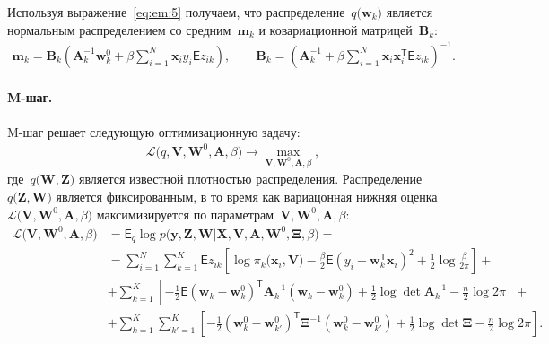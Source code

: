 Используя выражение~\eqref{eq:em:5} получаем, что  распределение~$q\bigr(\mathbf{w}_{k}\bigr)$ является нормальным распределением со средним~$\mathbf{m}_{k}$ и ковариационной матрицей~$\mathbf{B}_k$:
\[
\label{eq:em:6}
\begin{aligned}
\mathbf{m}_{k} = \mathbf{B}_{k}\left(\mathbf{A}_{k}^{-1}\mathbf{w}_{k}^{0}+\beta\sum_{i=1}^{N}\mathbf{x}_{i}y_{i}\mathsf{E}z_{ik}\right), \qquad \mathbf{B}_{k} = \left(\mathbf{A}_{k}^{-1}+\beta\sum_{i=1}^{N}\mathbf{x}_{i}\mathbf{x}_{i}^{\mathsf{T}}\mathsf{E}z_{ik}\right)^{-1}.
\end{aligned}
\]

\paragraph{M-шаг.} M-шаг решает следующую оптимизационную задачу:
\[
\label{eq:em:new:3}
\begin{aligned}
\mathcal{L}\bigr(q, \textbf{V}, \textbf{W}^{0}, \textbf{A}, \beta\bigr) \to \max_{\textbf{V}, \textbf{W}^{0}, \textbf{A}, \beta},
\end{aligned}
\]
где~$q\bigr(\textbf{W}, \textbf{Z}\bigr)$ является известной плотностью распределения.
Распределение~$q\bigr(\mathbf{Z}, \mathbf{W}\bigr)$ является фиксированным, в то время как вариацонная нижняя оценка~$\mathcal{L}\bigr(\textbf{V}, \textbf{W}^{0}, \textbf{A}, \beta\bigr)$ максимизируется по параметрам~$\mathbf{V}, \mathbf{W}^0, \textbf{A},  \beta$:
\[
\label{eq:em:7}
\begin{aligned}
\mathcal{L}\bigr(\textbf{V}, \textbf{W}^{0}, \textbf{A}, \beta\bigr) &= \mathsf{E}_{q}\log p\bigr(\mathbf{y}, \mathbf{Z}, \mathbf{W}|\mathbf{X}, \mathbf{V}, \textbf{A}, \textbf{W}^{0}, \bm{\Xi}, \beta\bigr) =  \\
&= \sum_{i=1}^{N}\sum_{k=1}^{K}\mathsf{E}z_{ik}\left[\log\pi_k\bigr(\textbf{x}_i, \textbf{V}\bigr) - \frac{\beta}{2}\mathsf{E}\left(y_{i} - \textbf{w}_{k}^{\mathsf{T}}\textbf{x}_{i}\right)^{2} + \frac{1}{2}\log\frac{\beta}{2\pi}\right] +\\
&+ \sum_{k=1}^{K}\left[-\frac{1}{2}\mathsf{E}\left(\textbf{w}_{k} - \textbf{w}_{k}^{0}\right)^{\mathsf{T}}\textbf{A}_{k}^{-1}\left(\textbf{w}_{k} - \textbf{w}_{k}^{0}\right) + \frac{1}{2}\log\det\textbf{A}^{-1}_{k} - \frac{n}{2}\log2\pi\right] +\\
&+ \sum_{k=1}^{K}\sum_{k'=1}^{K}\left[-\frac{1}{2}\left(\textbf{w}_{k}^{0}-\textbf{w}_{k'}^{0}\right)^{\mathsf{T}}\bm{\Xi}^{-1}\left(\textbf{w}_{k}^{0}-\textbf{w}_{k'}^{0}\right) +\frac{1}{2}\log\det\bm{\Xi} -\frac{n}{2}\log{2\pi}\right].
\end{aligned}
\]
